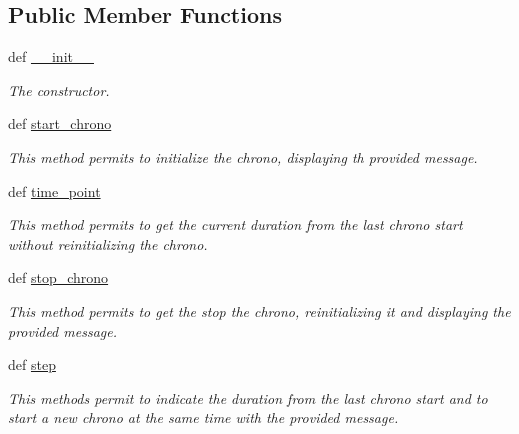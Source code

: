 \subsection*{Public Member Functions}
\begin{DoxyCompactItemize}
\item 
\hypertarget{classsrc_1_1fr_1_1tagc_1_1rainet_1_1core_1_1util_1_1time_1_1Timer_1_1Timer_a9ce4615485b15c5c4628c9eadb4362bf}{def \hyperlink{classsrc_1_1fr_1_1tagc_1_1rainet_1_1core_1_1util_1_1time_1_1Timer_1_1Timer_a9ce4615485b15c5c4628c9eadb4362bf}{\-\_\-\-\_\-init\-\_\-\-\_\-}}\label{classsrc_1_1fr_1_1tagc_1_1rainet_1_1core_1_1util_1_1time_1_1Timer_1_1Timer_a9ce4615485b15c5c4628c9eadb4362bf}

\begin{DoxyCompactList}\small\item\em The constructor. \end{DoxyCompactList}\item 
def \hyperlink{classsrc_1_1fr_1_1tagc_1_1rainet_1_1core_1_1util_1_1time_1_1Timer_1_1Timer_a516494bf5e8f6a43aa61aff0407fa888}{start\-\_\-chrono}
\begin{DoxyCompactList}\small\item\em This method permits to initialize the chrono, displaying th provided message. \end{DoxyCompactList}\item 
\hypertarget{classsrc_1_1fr_1_1tagc_1_1rainet_1_1core_1_1util_1_1time_1_1Timer_1_1Timer_a9600fba0b069850af1b0fd8d61a0c7e6}{def \hyperlink{classsrc_1_1fr_1_1tagc_1_1rainet_1_1core_1_1util_1_1time_1_1Timer_1_1Timer_a9600fba0b069850af1b0fd8d61a0c7e6}{time\-\_\-point}}\label{classsrc_1_1fr_1_1tagc_1_1rainet_1_1core_1_1util_1_1time_1_1Timer_1_1Timer_a9600fba0b069850af1b0fd8d61a0c7e6}

\begin{DoxyCompactList}\small\item\em This method permits to get the current duration from the last chrono start without reinitializing the chrono. \end{DoxyCompactList}\item 
def \hyperlink{classsrc_1_1fr_1_1tagc_1_1rainet_1_1core_1_1util_1_1time_1_1Timer_1_1Timer_aff134db7750ccbbe81b01d3b4a0c0144}{stop\-\_\-chrono}
\begin{DoxyCompactList}\small\item\em This method permits to get the stop the chrono, reinitializing it and displaying the provided message. \end{DoxyCompactList}\item 
def \hyperlink{classsrc_1_1fr_1_1tagc_1_1rainet_1_1core_1_1util_1_1time_1_1Timer_1_1Timer_a59cf9454490076d163c13a472507f434}{step}
\begin{DoxyCompactList}\small\item\em This methods permit to indicate the duration from the last chrono start and to start a new chrono at the same time with the provided message. \end{DoxyCompactList}\end{DoxyCompactItemize}
